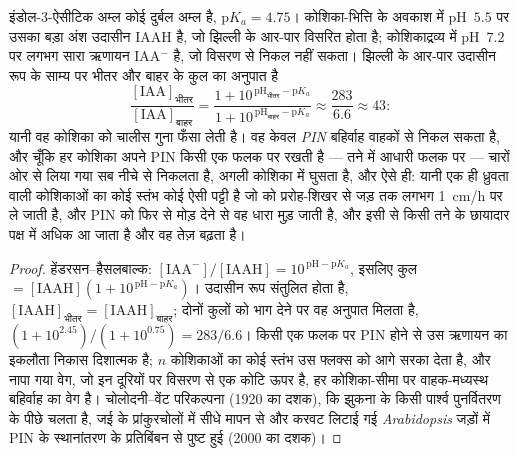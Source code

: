 \begin{theorem}\label{thm:b3:plant-molecular-physiology:auxin}
इंडोल-3-ऐसीटिक अम्ल कोई दुर्बल अम्ल है, $\mathrm{p}K_{a} = 4.75$।
कोशिका-भित्ति के अवकाश में pH~$5.5$ पर उसका बड़ा अंश उदासीन IAAH है, जो
झिल्ली के आर-पार विसरित होता है; कोशिकाद्रव्य में pH~$7.2$ पर लगभग सारा
ऋणायन IAA$^{-}$ है, जो विसरण से निकल नहीं सकता। झिल्ली के आर-पार उदासीन
रूप के साम्य पर भीतर और बाहर के कुल  का अनुपात है
\[
\frac{[\text{IAA}]_{\text{भीतर}}}{[\text{IAA}]_{\text{बाहर}}}
= \frac{1 + 10^{\,\mathrm{pH}_{\text{भीतर}} - \mathrm{p}K_{a}}}{1 + 10^{\,\mathrm{pH}_{\text{बाहर}} - \mathrm{p}K_{a}}}
\approx \frac{283}{6.6} \approx 43 :
\]
यानी वह कोशिका  को चालीस गुना फँसा लेती है। वह केवल \emph{PIN}
बहिर्वाह वाहकों से निकल सकता है, और चूँकि हर कोशिका अपने PIN किसी एक
फलक पर रखती है --- तने में आधारी फलक पर --- चारों ओर से लिया गया 
सब नीचे से निकलता है, अगली कोशिका में घुसता है, और ऐसे ही: यानी एक ही
ध्रुवता वाली कोशिकाओं का कोई स्तंभ कोई ऐसी पट्टी है जो  को
प्ररोह-शिखर से जड़ तक लगभग \qty{1}{cm/h} पर ले जाती है, और PIN को फिर
से मोड़ देने से वह धारा मुड़ जाती है, और इसी से किसी तने के छायादार पक्ष
में अधिक  आ जाता है और वह तेज़ बढ़ता है।
\end{theorem}
\begin{proof}
हेंडरसन--हैसलबाल्क: $[\text{IAA}^{-}]/[\text{IAAH}] = 10^{\,\mathrm{pH}
- \mathrm{p}K_{a}}$, इसलिए कुल $= [\text{IAAH}](1 + 10^{\,\mathrm{pH} -
\mathrm{p}K_{a}})$। उदासीन रूप संतुलित होता है, $[\text{IAAH}]_{\text{भीतर}}
= [\text{IAAH}]_{\text{बाहर}}$; दोनों कुलों को भाग देने पर वह अनुपात
मिलता है, $(1 + 10^{2.45})/(1 + 10^{0.75}) = 283/6.6$। किसी एक फलक पर
PIN होने से उस ऋणायन का इकलौता निकास दिशात्मक है; $n$ कोशिकाओं का कोई
स्तंभ उस फ्लक्स को आगे सरका देता है, और नापा गया वेग, जो इन दूरियों पर
विसरण से एक कोटि ऊपर है, हर कोशिका-सीमा पर वाहक-मध्यस्थ बहिर्वाह का
वेग है। चोलोदनी--वेंट परिकल्पना (1920 का दशक), कि झुकना  के किसी
पार्श्व पुनर्वितरण के पीछे चलता है, जई के प्रांकुरचोलों में सीधे मापन से
और करवट लिटाई गई \emph{Arabidopsis} जड़ों में PIN के स्थानांतरण के
प्रतिबिंबन से पुष्ट हुई (2000 का दशक)।
\end{proof}

